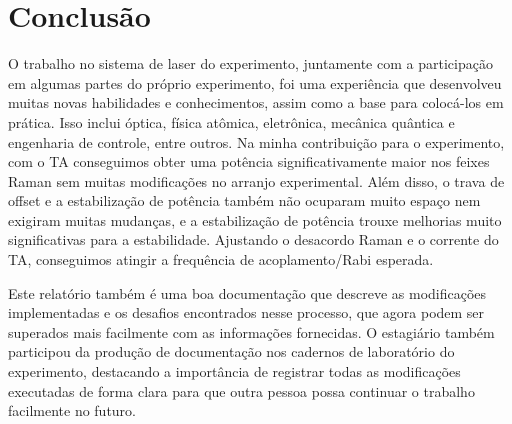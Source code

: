 \section{Conclusão}

O trabalho no sistema de laser do experimento, juntamente com a participação em algumas partes do próprio experimento, foi uma experiência que desenvolveu muitas novas habilidades e conhecimentos, assim como a base para colocá-los em prática. Isso inclui óptica, física atômica, eletrônica, mecânica quântica e engenharia de controle, entre outros. Na minha contribuição para o experimento, com o \gls{TA} conseguimos obter uma potência significativamente maior nos feixes Raman sem muitas modificações no arranjo experimental. Além disso, o trava de offset e a estabilização de potência também não ocuparam muito espaço nem exigiram muitas mudanças, e a estabilização de potência trouxe melhorias muito significativas para a estabilidade. Ajustando o desacordo Raman e o corrente do TA, conseguimos atingir a frequência de acoplamento/Rabi esperada.

Este relatório também é uma boa documentação que descreve as modificações implementadas e os desafios encontrados nesse processo, que agora podem ser superados mais facilmente com as informações fornecidas. O estagiário também participou da produção de documentação nos cadernos de laboratório do experimento, destacando a importância de registrar todas as modificações executadas de forma clara para que outra pessoa possa continuar o trabalho facilmente no futuro.
